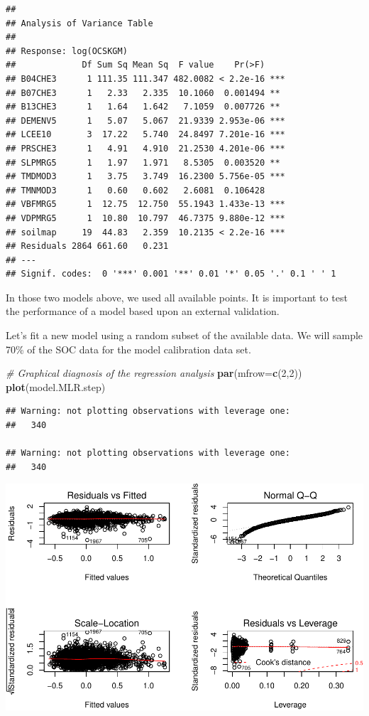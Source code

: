 \documentclass[10pt,b5paper,]{book}
\newenvironment{Shaded}{\begin{snugshade}}{\end{snugshade}}
\newcommand{\CommentTok}[1]{\textcolor[rgb]{0.56,0.35,0.01}{\textit{#1}}}
\newcommand{\DataTypeTok}[1]{\textcolor[rgb]{0.13,0.29,0.53}{#1}}
\newcommand{\DecValTok}[1]{\textcolor[rgb]{0.00,0.00,0.81}{#1}}
\newcommand{\KeywordTok}[1]{\textcolor[rgb]{0.13,0.29,0.53}{\textbf{#1}}}
\newcommand{\NormalTok}[1]{#1}
\theoremstyle{definition}
\theoremstyle{definition}
\theoremstyle{definition}
\theoremstyle{remark}
\begin{document}
\begin{verbatim}
## 
## Analysis of Variance Table
## 
## Response: log(OCSKGM)
##             Df Sum Sq Mean Sq  F value    Pr(>F)    
## B04CHE3      1 111.35 111.347 482.0082 < 2.2e-16 ***
## B07CHE3      1   2.33   2.335  10.1060  0.001494 ** 
## B13CHE3      1   1.64   1.642   7.1059  0.007726 ** 
## DEMENV5      1   5.07   5.067  21.9339 2.953e-06 ***
## LCEE10       3  17.22   5.740  24.8497 7.201e-16 ***
## PRSCHE3      1   4.91   4.910  21.2530 4.201e-06 ***
## SLPMRG5      1   1.97   1.971   8.5305  0.003520 ** 
## TMDMOD3      1   3.75   3.749  16.2300 5.756e-05 ***
## TMNMOD3      1   0.60   0.602   2.6081  0.106428    
## VBFMRG5      1  12.75  12.750  55.1943 1.433e-13 ***
## VDPMRG5      1  10.80  10.797  46.7375 9.880e-12 ***
## soilmap     19  44.83   2.359  10.2135 < 2.2e-16 ***
## Residuals 2864 661.60   0.231                       
## ---
## Signif. codes:  0 '***' 0.001 '**' 0.01 '*' 0.05 '.' 0.1 ' ' 1
\end{verbatim}

In those two models above, we used all available points. It is important
to test the performance of a model based upon an external validation.

Let's fit a new model using a random subset of the available data. We
will sample 70\% of the SOC data for the model calibration data set.

\begin{Shaded}
\begin{Highlighting}[]
\CommentTok{# Graphical diagnosis of the regression analysis}
\KeywordTok{par}\NormalTok{(}\DataTypeTok{mfrow=}\KeywordTok{c}\NormalTok{(}\DecValTok{2}\NormalTok{,}\DecValTok{2}\NormalTok{))}
\KeywordTok{plot}\NormalTok{(model.MLR.step)}
\end{Highlighting}
\end{Shaded}

\begin{verbatim}
## Warning: not plotting observations with leverage one:
##   340

## Warning: not plotting observations with leverage one:
##   340
\end{verbatim}

\includegraphics{SOCMapping_files/figure-latex/unnamed-chunk-42-1.pdf}
\end{document}
